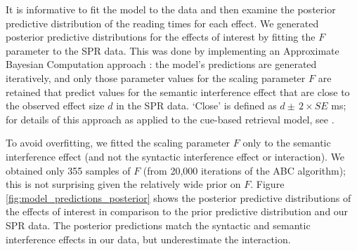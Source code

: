 \documentclass[a4paper, man, floatsintext]{apa7}
\begin{document}
It is informative to fit the model to the data and then examine the posterior predictive distribution of the reading times for each effect. 
We generated posterior predictive distributions for the effects of interest by fitting the $F$ parameter to the SPR data. This was done by implementing an Approximate Bayesian Computation approach \parencite{SissonABC}: the model's predictions are generated iteratively, and only those parameter values for the  scaling parameter $F$ are retained that predict values for the semantic interference effect that are close to the observed effect size $d$ in the SPR data. `Close' is defined as $d \pm \,2\times SE$ ms; for details of this approach as applied to the cue-based retrieval model, see  \textcite{vasishth2020_abc}.

To avoid overfitting, we fitted the scaling parameter $F$ only to the semantic interference effect (and not the syntactic interference effect or interaction). 
We obtained only 355 samples of $F$ (from 20,000 iterations of the ABC algorithm); this is not surprising given the relatively wide prior on $F$.
Figure \ref{fig:model_predictions_posterior} shows the posterior predictive distributions of the effects of interest in comparison to the prior predictive distribution and our SPR data. The posterior predictions match the syntactic and semantic interference effects in our data, but underestimate the interaction.
\end{document}
